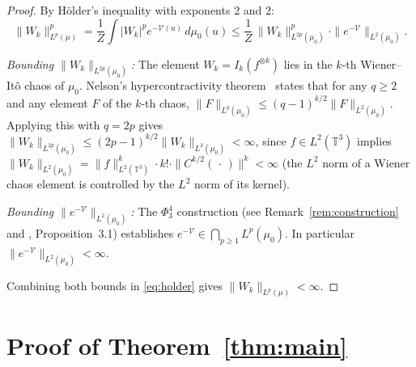\documentclass[11pt,a4paper]{article}
\theoremstyle{plain}
\theoremstyle{definition}
\newcommand{\T}{\mathbb{T}}
\newcommand{\cV}{\mathcal{V}}
\newcommand{\norm}[1]{\|#1\|}
\begin{document}
\begin{proof}
By H\"{o}lder's inequality with exponents $2$ and $2$:
\begin{equation}\label{eq:holder}
  \norm{W_k}_{L^p(\mu)}^p
  = \frac{1}{Z}\int|W_k|^p e^{-\cV(u)}\,d\mu_0(u)
  \le \frac{1}{Z}\,\norm{W_k}_{L^{2p}(\mu_0)}^{p}
      \cdot\norm{e^{-\cV}}_{L^2(\mu_0)}.
\end{equation}

\emph{Bounding $\norm{W_k}_{L^{2p}(\mu_0)}$:}
The element $W_k = I_k(f^{\otimes k})$ lies in the $k$-th Wiener--It\^o chaos of $\mu_0$.
Nelson's hypercontractivity theorem~\cite{Nel73} states that for any $q\ge 2$ and any
element $F$ of the $k$-th chaos,
$\norm{F}_{L^q(\mu_0)} \le (q-1)^{k/2}\norm{F}_{L^2(\mu_0)}$.
Applying this with $q=2p$ gives
$\norm{W_k}_{L^{2p}(\mu_0)} \le (2p-1)^{k/2}\norm{W_k}_{L^2(\mu_0)} < \infty$,
since $f\in L^2(\T^3)$ implies $\norm{W_k}_{L^2(\mu_0)}
= \norm{f}_{L^2(\T^3)}^k \cdot k! \cdot \norm{C^{k/2}(\,\cdot\,)}^k < \infty$
(the $L^2$ norm of a Wiener chaos element is controlled by the $L^2$ norm of its kernel).

\emph{Bounding $\norm{e^{-\cV}}_{L^2(\mu_0)}$:}
The $\Phi^4_3$ construction (see Remark~\ref{rem:construction} and \cite{BG20}, Proposition~3.1)
establishes $e^{-\cV}\in\bigcap_{p\ge1}L^p(\mu_0)$.
In particular $\norm{e^{-\cV}}_{L^2(\mu_0)}<\infty$.

Combining both bounds in \eqref{eq:holder} gives $\norm{W_k}_{L^p(\mu)}<\infty$.
\end{proof}

\section{Proof of Theorem~\ref{thm:main}}
\end{document}

